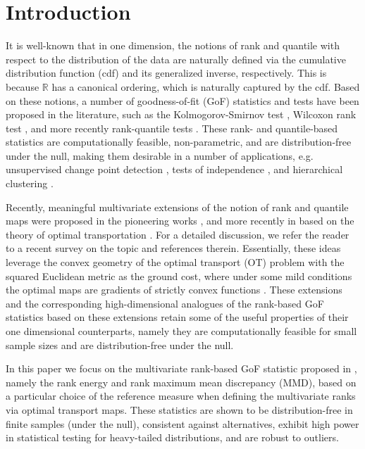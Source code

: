 \documentclass{article}
\theoremstyle{definition}
\begin{document}
\section{Introduction}
It is well-known that in one dimension, the notions of rank and quantile with respect to the distribution of the data are naturally defined via the cumulative distribution function (cdf) and its generalized inverse, respectively. This is because $\mathbb{R}$ has a canonical ordering, which is naturally captured by the cdf.  Based on these notions, a number of goodness-of-fit (GoF) statistics and tests have been proposed in the literature, such as the Kolmogorov-Smirnov test \cite{smirnov1939estimation}, Wilcoxon rank test \cite{wilcoxon1947probability}, and more recently rank-quantile tests \cite{ramdas2017wasserstein}. These rank- and quantile-based statistics are computationally feasible, non-parametric, and are distribution-free under the null, making them desirable in a number of applications, e.g. unsupervised change point detection \cite{OJSP_2020_Cheng}, tests of independence \cite{gretton2007kernel, heller2013consistent}, and hierarchical clustering \cite{szekely2005hierarchical}.

Recently, meaningful multivariate extensions of the notion of rank and quantile maps were proposed in the pioneering works \cite{hallin2017distribution, hallin2021distribution,chernozhukov2017monge}, and more recently in \cite{deb2021multivariate} based on the theory of optimal transportation \cite{villani2009optimal, santambrogio2015optimal}. For a detailed discussion, we refer the reader to a recent survey on the topic \cite{hallin2021measure} and references therein. Essentially, these ideas leverage the convex geometry of the optimal transport (OT) problem with the squared Euclidean metric as the ground cost, where under some mild conditions the optimal maps are gradients of strictly convex functions \cite{mccann1995existence,brenier1991polar}. These extensions and the corresponding high-dimensional analogues of the rank-based GoF statistics based on these extensions retain some of the useful properties of their one dimensional counterparts, namely they are computationally feasible for small sample sizes and are distribution-free under the null.

In this paper we focus on the multivariate rank-based GoF statistic proposed in \cite{deb2021multivariate}, namely the rank energy and rank maximum mean discrepancy (MMD), based on a particular choice of the reference measure when defining the multivariate ranks via optimal transport maps. These statistics are shown to be distribution-free in finite samples (under the null), consistent against alternatives, exhibit high power in statistical testing for heavy-tailed distributions, and are robust to outliers.
\end{document}
